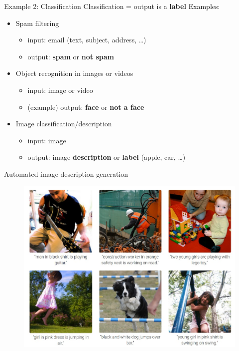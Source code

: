 \documentclass{beamer}
\begin{document}
\begin{frame}{Example 2: Classification}
\vfill
Classification = output is a \textbf{label}
\vfill
Examples: 
\pause
\vfill
\begin{itemize}
	\item Spam filtering
	\begin{itemize}
		\item input: email (text, subject, address, \ldots)
		\item output: \textbf{spam} or \textbf{not spam}
	\end{itemize}
\pause
\vfill
	\item Object recognition in images or videos
	\begin{itemize}
		\item input: image or video
		\item (example) output: \textbf{face} or \textbf{not a face}
	\end{itemize}
\pause
\vfill
	\item Image classification/description
	\begin{itemize}
		\item input: image
		\item output: image \textbf{description} or \textbf{label} (apple, car, \ldots)
	\end{itemize}
\end{itemize}
\vfill

\end{frame}

\begin{frame}{Automated image description generation}

\begin{figure}
\centering
\includegraphics[width=\textwidth]{images/generated_descriptions.jpg}
\end{figure}
\end{frame}
\end{document}
